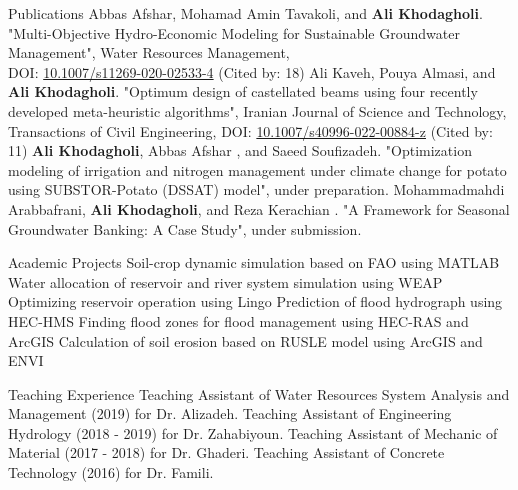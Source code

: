 \documentclass{resume}
\begin{document}
\vspace{0cm}
\begin{category} {Publications}
\citembullet Abbas Afshar, Mohamad Amin Tavakoli, and \textbf{Ali Khodagholi}. "Multi-Objective Hydro-Economic Modeling for Sustainable Groundwater Management", Water Resources Management, \\
DOI: \href{https://doi.org/10.1007/s11269-020-02533-4}{10.1007/s11269-020-02533-4}
\hfill (Cited by: 18)
\citembullet Ali Kaveh, Pouya Almasi, and \textbf{Ali Khodagholi}. "Optimum design of castellated beams using four recently developed meta-heuristic algorithms", Iranian Journal of Science and Technology, Transactions of Civil Engineering, DOI: \href{https://doi.org/10.1007/s40996-022-00884-z}{10.1007/s40996-022-00884-z}
\hfill (Cited by: 11)
\citembullet \textbf{Ali Khodagholi}, Abbas Afshar , and Saeed Soufizadeh. "Optimization modeling of irrigation and nitrogen management under climate change for potato using SUBSTOR-Potato (DSSAT) model", under preparation.
\citembullet Mohammadmahdi Arabbafrani, \textbf{Ali Khodagholi}, and Reza Kerachian . "A Framework for Seasonal Groundwater Banking: A Case Study", under submission.
\end{category}
\vspace{0.7cm}
\begin{category} {Academic Projects}
\citembullet Soil-crop dynamic simulation based on FAO using MATLAB
\citembullet Water allocation of reservoir and river system simulation using WEAP
\citembullet Optimizing reservoir operation using Lingo
\citembullet Prediction of flood hydrograph using HEC-HMS
\citembullet Finding flood zones for flood management using HEC-RAS and ArcGIS
\citembullet Calculation of soil erosion based on RUSLE model using ArcGIS and ENVI
\end{category}
\vspace{0cm}
\begin{category} {Teaching Experience}
\citembullet Teaching Assistant of Water Resources System Analysis and Management (2019) for Dr. Alizadeh.
\citembullet Teaching Assistant of Engineering Hydrology (2018 - 2019) for Dr. Zahabiyoun.
\citembullet Teaching Assistant of Mechanic of Material (2017 - 2018) for Dr. Ghaderi.
\citembullet Teaching Assistant of Concrete Technology (2016) for Dr. Famili.
\end{category}
\end{document}
